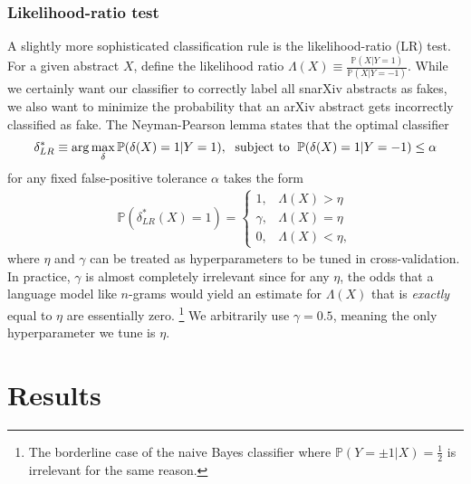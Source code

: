 \documentclass{article}
\renewcommand{\P}{\mathbb{P}}
\begin{document}
\subsubsection{Likelihood-ratio test}
A slightly more sophisticated classification rule is the likelihood-ratio (LR) test.
For a given abstract $X$, define the likelihood ratio $\Lambda(X)\equiv\frac{\P(X|Y=1)}{\P(X|Y=-1)}$.
While we certainly want our classifier to correctly label all snarXiv abstracts as fakes, we also want to minimize the probability that an arXiv abstract gets incorrectly classified as fake.
The Neyman-Pearson lemma states that the optimal classifier
\begin{align}
	\delta_{LR}^* \equiv \arg\max_\delta \P(\delta(X)=1|Y=1), \text{\; subject to \;} \P(\delta(X)=1|Y=-1)\leq \alpha
\end{align}
for any fixed false-positive tolerance $\alpha$ takes the form
\begin{align}
	\P\left(\delta_{LR}^*(X)=1\right) =
	\begin{cases}
		1, 	& \Lambda(X) > \eta \\
		\gamma, & \Lambda(X) = \eta \\
		0, 	& \Lambda(X) < \eta,
	\end{cases}
\end{align}
where $\eta$ and $\gamma$ can be treated as hyperparameters to be tuned in cross-validation.
In practice, $\gamma$ is almost completely irrelevant since for any $\eta$, the odds that a language model like $n$-grams would yield an estimate for $\Lambda(X)$ that is \textit{exactly} equal to $\eta$ are essentially zero.%
\footnote{The borderline case of the naive Bayes classifier where $\P(Y=\pm1|X)=\frac{1}{2}$ is irrelevant for the same reason.}
%
We arbitrarily use $\gamma=0.5$, meaning the only hyperparameter we tune is $\eta$.











\section{Results}
\end{document}
